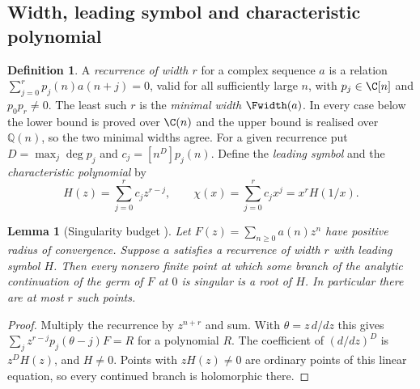 \documentclass[11pt,a4paper]{article}
\newtheorem{lemma}[theorem]{Lemma}
\theoremstyle{definition}
\newtheorem{definition}[theorem]{Definition}
\theoremstyle{remark}
\numberwithin{equation}{section}
\newcommand{\Q}{\mathbb Q}\newcommand{\Z}{\mathbb Z}
\begin{document}
\subsection{Width, leading symbol and characteristic polynomial}\label{B:F:ssec:conv}

\begin{definition}\label{B:F:def:width}
A \emph{recurrence of width $r$} for a complex sequence $a$ is a relation
$\sum_{j=0}^r p_j(n)a(n+j)=0$, valid for all sufficiently large $n$, with
$p_j\in\C[n]$ and $p_0p_r\ne0$. The least such $r$ is the \emph{minimal
width} $\Fwidth(a)$. In every case below the lower bound is proved over
$\C(n)$ and the upper bound is realised over $\Q(n)$, so the two minimal
widths agree. For a given recurrence put
$D=\max_j\deg p_j$ and $c_j=[n^D]p_j(n)$. Define the \emph{leading symbol}
and the \emph{characteristic polynomial} by
\[
 H(z)=\sum_{j=0}^r c_jz^{r-j},\qquad
 \chi(x)=\sum_{j=0}^r c_jx^j=x^rH(1/x).
\]
\end{definition}

\begin{lemma}[Singularity budget {\cite[Lemma~2.1]{R021}}]\label{B:F:lem:budget}
Let $F(z)=\sum_{n\ge0}a(n)z^n$ have positive radius of convergence. Suppose
$a$ satisfies a recurrence of width $r$ with leading symbol $H$. Then every
nonzero finite point at which some branch of the analytic continuation of
the germ of $F$ at $0$ is singular is a root of $H$. In particular there are
at most $r$ such points.
\end{lemma}

\begin{proof}
Multiply the recurrence by $z^{n+r}$ and sum. With $\theta=z\,d/dz$ this
gives $\sum_jz^{r-j}p_j(\theta-j)F=R$ for a polynomial $R$. The coefficient
of $(d/dz)^D$ is $z^DH(z)$, and $H\ne0$. Points with $zH(z)\ne0$ are
ordinary points of this linear equation, so every continued branch is
holomorphic there.
\end{proof}
\end{document}
